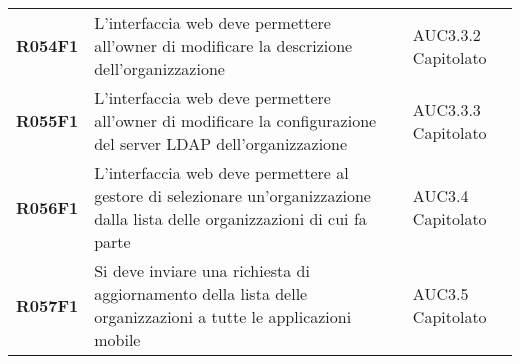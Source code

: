 \documentclass[../analisi-dei-requisiti.tex]{subfiles}
\begin{document}
\begin{longtable}[H]{>{\centering\bfseries}m{3cm} >{\centering}m{10cm} >{\centering\arraybackslash}m{3cm}}
  R054F1                               & L'interfaccia web deve permettere all'owner di modificare la descrizione dell'organizzazione                                                                                                            & AUC3.3.2 Capitolato           \\
  R055F1                               & L'interfaccia web deve permettere all'owner di modificare la configurazione del server LDAP dell'organizzazione                                                                                         & AUC3.3.3 Capitolato           \\
  R056F1                               & L'interfaccia web deve permettere al gestore di selezionare un'organizzazione dalla lista delle organizzazioni di cui fa parte                                                                          & AUC3.4 Capitolato             \\
  R057F1                               & Si deve inviare una richiesta di aggiornamento della lista delle organizzazioni a tutte le applicazioni mobile                                                                                          & AUC3.5 Capitolato             \\


\end{longtable}
\end{document}
